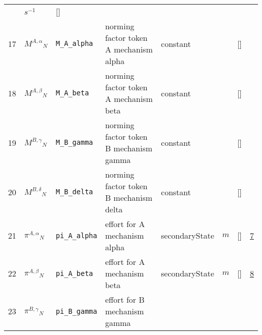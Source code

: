 \begin{longtable}{|p{1cm}|p{3cm}|p{3cm}|p{7cm}|p{3.0cm}|p{3cm}|p{2cm}|p{1cm}|}
             & $ s^{-1} \, $
             & []
             & \\
    17
             & \hypertarget{"v:17"}{ $ {{M^{A,\alpha}}}{_{N}} $}
             & \verb|M_A_alpha|
             & norming factor token A mechanism alpha
             & \begin{lay}constant \end{lay}
             & $  $
             & []
             & \\
    18
             & \hypertarget{"v:18"}{ $ {{M^{A,\beta}}}{_{N}} $}
             & \verb|M_A_beta|
             & norming factor token A mechanism beta
             & \begin{lay}constant \end{lay}
             & $  $
             & []
             & \\
    19
             & \hypertarget{"v:19"}{ $ {{M^{B,\gamma}}}{_{N}} $}
             & \verb|M_B_gamma|
             & norming factor token B mechanism gamma
             & \begin{lay}constant \end{lay}
             & $  $
             & []
             & \\
    20
             & \hypertarget{"v:20"}{ $ {{M^{B,\delta}}}{_{N}} $}
             & \verb|M_B_delta|
             & norming factor token B mechanism delta
             & \begin{lay}constant \end{lay}
             & $  $
             & []
             & \\
    21
             & \hypertarget{"v:21"}{ $ {{\pi^{A,\alpha}}}{_{N}} $}
             & \verb|pi_A_alpha|
             & effort for A mechanism alpha
             & \begin{lay}secondaryState \end{lay}
             & $ m  $
             & []
             & \hyperlink{"e:7"}{ 7 }
                 \\
    22
             & \hypertarget{"v:22"}{ $ {{\pi^{A,\beta}}}{_{N}} $}
             & \verb|pi_A_beta|
             & effort for A mechanism beta
             & \begin{lay}secondaryState \end{lay}
             & $ m  $
             & []
             & \hyperlink{"e:8"}{ 8 }
                 \\
    23
             & \hypertarget{"v:23"}{ $ {{\pi^{B,\gamma}}}{_{N}} $}
             & \verb|pi_B_gamma|
             & effort for B mechanism gamma

\end{longtable}
